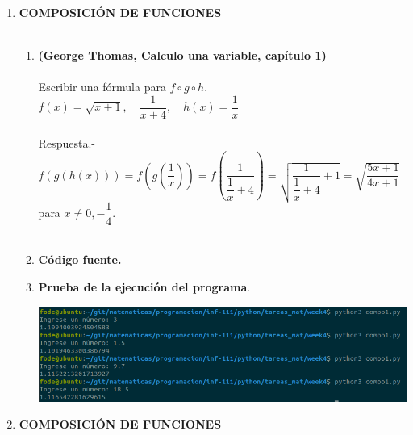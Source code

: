 \begin{enumerate}

\item \textbf{\large COMPOSICIÓN DE FUNCIONES}\\\\

    \begin{enumerate}[\bfseries a)]

	\item \textbf{(George Thomas, Calculo una variable, capítulo 1)}\\\\ 
	    Escribir una fórmula para $f\circ g \circ h$.  $f(x)=\sqrt{x+1},\quad \dfrac{1}{x+4}, \quad h(x)=\dfrac{1}{x}$\\\\ 
	    Respuesta.-\; $f(g(h(x))) = f\left(g \left(\dfrac{1}{x}\right) \right) = f\left(\dfrac{1}{\dfrac{1}{x} + 4}\right) = \sqrt{\dfrac{1}{\dfrac{1}{x} + 4} + 1} = \sqrt{\dfrac{5x+1}{4x+1}}$ para $ x \neq 0, -\dfrac{1}{4}$.\\\\

	\item \textbf{Código fuente.}\\ 
	    
	    
	    \vspace{.5cm}
	
	\item \textbf{Prueba de la ejecución del programa}.\\
	    \begin{center}
		\includegraphics[scale=.5]{imagenes/tareas_mat/week4/compo1.png}
	    \end{center}

    \end{enumerate}

\newpage

\item \textbf{\large COMPOSICIÓN DE FUNCIONES}\\\\


\end{enumerate}
